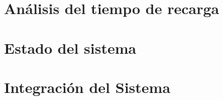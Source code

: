 \section{Análisis del tiempo de recarga}
\label{sec:recarga}

\section{Estado del sistema}
\label{sec:estado}

\section{Integración del Sistema}
\label{sec:Integración}

